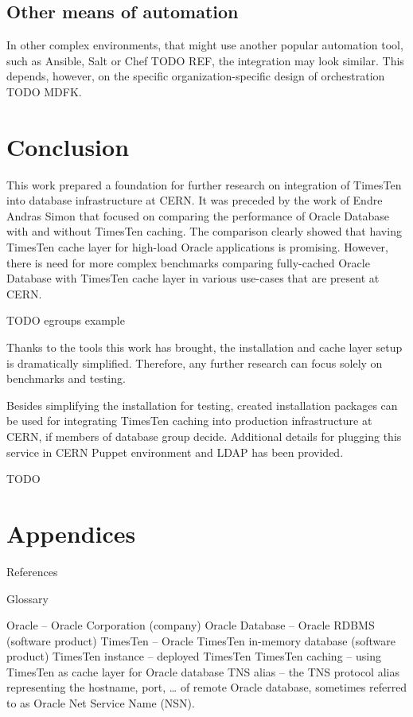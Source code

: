 \documentclass[11pt, letterpaper]{article}            %
\begin{document}
\subsection{Other means of automation}

In other complex environments, that might use another popular automation tool, such as Ansible, Salt or Chef TODO REF, the integration may look similar. This depends, however, on the specific organization-specific design of orchestration TODO MDFK.


\section{Conclusion}

This work prepared a foundation for further research on integration of TimesTen into database infrastructure at CERN. It was preceded by the work of Endre Andras Simon that focused on comparing the performance of Oracle Database with and without TimesTen caching. The comparison clearly showed that having TimesTen cache layer for high-load Oracle applications is promising. However, there is need for more complex benchmarks comparing fully-cached Oracle Database with TimesTen cache layer in various use-cases that are present at CERN.

TODO egroups example

Thanks to the tools this work has brought, the installation and cache layer setup is dramatically simplified. Therefore, any further research can focus solely on benchmarks and testing.

Besides simplifying the installation for testing, created installation packages can be used for integrating TimesTen caching into production infrastructure at CERN, if members of database group decide. Additional details for plugging this service in CERN Puppet environment and LDAP has been provided.

TODO

\section{Appendices}
References

Glossary

Oracle – Oracle Corporation (company)
Oracle Database – Oracle RDBMS (software product)
TimesTen – Oracle TimesTen in-memory database (software product)
TimesTen instance – deployed TimesTen
TimesTen caching – using TimesTen as cache layer for Oracle database
TNS alias – the TNS protocol alias representing the hostname, port, … of remote Oracle database, sometimes referred to as Oracle Net Service Name (NSN).
\end{document}
